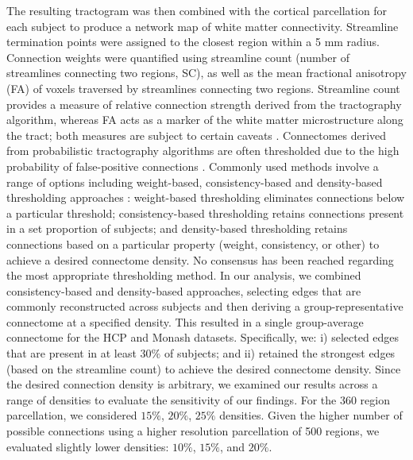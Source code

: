 The resulting tractogram was then combined with the cortical parcellation for each subject to produce a network map of white matter connectivity. Streamline termination points were assigned to the closest region within a 5 mm radius. Connection weights were quantified using streamline count (number of streamlines connecting two regions, SC), as well as the mean fractional anisotropy (FA) of voxels traversed by streamlines connecting two regions. Streamline count provides a measure of relative connection strength derived from the tractography algorithm, whereas FA acts as a marker of the white matter microstructure along the tract; both measures are subject to certain caveats \citep{Jones2013}.
Connectomes derived from probabilistic tractography algorithms are often thresholded due to the high probability of false-positive connections \citep{Sarwar2019,Sotiropoulos2017}. Commonly used methods involve a range of options including weight-based, consistency-based and density-based thresholding approaches \citep{Betzel2018,Roberts2016a}: weight-based thresholding eliminates connections below a particular threshold; consistency-based thresholding retains connections present in a set proportion of subjects; and density-based thresholding retains connections based on a particular property (weight, consistency, or other) to achieve a desired connectome density. No consensus has been reached regarding the most appropriate thresholding method. In our analysis, we combined consistency-based and density-based approaches, selecting edges that are commonly reconstructed across subjects and then deriving a group-representative connectome at a specified density. This resulted in a single group-average connectome for the HCP and Monash datasets. Specifically, we: i) selected edges that are present in at least $30\%$ of subjects; and ii) retained the strongest edges (based on the streamline count) to achieve the desired connectome density. Since the desired connection density is arbitrary, we examined our results across a range of densities to evaluate the sensitivity of our findings. For the 360 region parcellation, we considered $15\%$, $20\%$, $25\%$ densities. Given the higher number of possible connections using a higher resolution parcellation of 500 regions, we evaluated slightly lower densities: $10\%$, $15\%$, and $20\%$.

